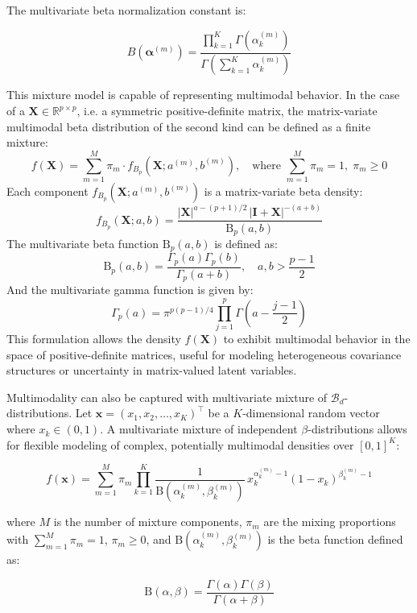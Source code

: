 \documentclass[11pt]{article}
\begin{document}
The multivariate beta normalization constant is:

\[
B(\boldsymbol{\alpha}^{(m)}) = \frac{\prod_{k=1}^{K} \Gamma(\alpha_k^{(m)})}{\Gamma\left(\sum_{k=1}^{K} \alpha_k^{(m)}\right)}
\]

This mixture model is capable of representing multimodal behavior. In the case of a $\mathbf{X} \in \mathbb{R}^{p \times p}$, i.e. a symmetric positive-definite matrix, the matrix-variate multimodal beta distribution of the second kind can be defined as a finite mixture:
\[
f(\mathbf{X}) = \sum_{m=1}^{M} \pi_m \cdot f_{B_p}(\mathbf{X}; a^{(m)}, b^{(m)}), \quad \text{where } \sum_{m=1}^{M} \pi_m = 1, \; \pi_m \geq 0
\]
Each component $f_{B_p}(\mathbf{X}; a^{(m)}, b^{(m)})$ is a matrix-variate beta density:
\[
f_{B_p}(\mathbf{X}; a, b) = \frac{|\mathbf{X}|^{a - (p+1)/2} \, |\mathbf{I} + \mathbf{X}|^{-(a + b)}}{\mathrm{B}_p(a, b)}
\]
The multivariate beta function $\mathrm{B}_p(a, b)$ is defined as:
\[
\mathrm{B}_p(a, b) = \frac{\Gamma_p(a) \Gamma_p(b)}{\Gamma_p(a + b)}, \quad a, b > \frac{p-1}{2}
\]
And the multivariate gamma function is given by:
\[
\Gamma_p(a) = \pi^{p(p-1)/4} \prod_{j=1}^{p} \Gamma\left(a - \frac{j - 1}{2} \right)
\]
This formulation allows the density $f(\mathbf{X})$ to exhibit multimodal behavior in the space of positive-definite matrices, useful for modeling heterogeneous covariance structures or uncertainty in matrix-valued latent variables.


Multimodality can also be captured with multivariate mixture of $\mathcal{B}_d$- distributions. Let $\mathbf{x} = (x_1, x_2, \dots, x_K)^\top$ be a $K$-dimensional random vector where $x_k \in (0, 1)$. A multivariate mixture of independent $\beta$-distributions allows for flexible modeling of complex, potentially multimodal densities over $[0,1]^K$:

\[
f(\mathbf{x}) = \sum_{m=1}^{M} \pi_m \prod_{k=1}^{K} \frac{1}{\mathrm{B}(\alpha_k^{(m)}, \beta_k^{(m)})} \, x_k^{\alpha_k^{(m)} - 1} (1 - x_k)^{\beta_k^{(m)} - 1}
\]

where $M$ is the number of mixture components, $\pi_m$ are the mixing proportions with $\sum_{m=1}^{M} \pi_m = 1$, $\pi_m \geq 0$, and $\mathrm{B}(\alpha_k^{(m)}, \beta_k^{(m)})$ is the beta function defined as:

\[
\mathrm{B}(\alpha, \beta) = \frac{\Gamma(\alpha) \Gamma(\beta)}{\Gamma(\alpha + \beta)}
\]
\end{document}
